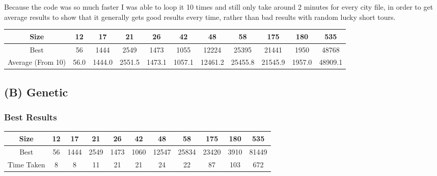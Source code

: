 \documentclass[11pt]{article}
\begin{document}
			\par
			Because the code was so much faster I was able to loop it 10 times and still only take around 2 minutes for every city file, in order to get average results to show that it generally gets good results every time, rather than bad results with random lucky short tours.
		\begin{center}
			\begin{tabular}{| c | c | c | c | c | c | c | c | c | c | c |}
				\hline
				Size & 12 & 17 & 21 & 26 & 42 & 48 & 58 & 175 & 180 & 535 \\
				\hline
				 Best & 56 & 1444 & 2549 & 1473 & 1055 & 12224 & 25395 & 21441 & 1950 & 48768 \\
				\hline
				Average (From 10) & 56.0 & 1444.0 & 2551.5 & 1473.1 & 1057.1 & 12461.2 & 25455.8 & 21545.9 & 1957.0 & 48909.1 \\
				\hline		
			\end{tabular}
		\end{center}
	
	
	\subsection*{(B) Genetic}
	
		\subsubsection*{Best Results}
			\begin{center}
				\begin{tabular}{| c | c | c | c | c | c | c | c | c | c | c |}
					\hline
					Size & 12 & 17 & 21 & 26 & 42 & 48 & 58 & 175 & 180 & 535 \\
					\hline
					Best & 56 & 1444 & 2549 & 1473 & 1060 & 12547 & 25834 & 23420 & 3910 & 81449 \\
					\hline
					Time Taken & 8 & 8 & 11 & 21 & 21 & 24 & 22 & 87 & 103 & 672 \\
					\hline			
				\end{tabular}
			\end{center}
		
\end{document}
